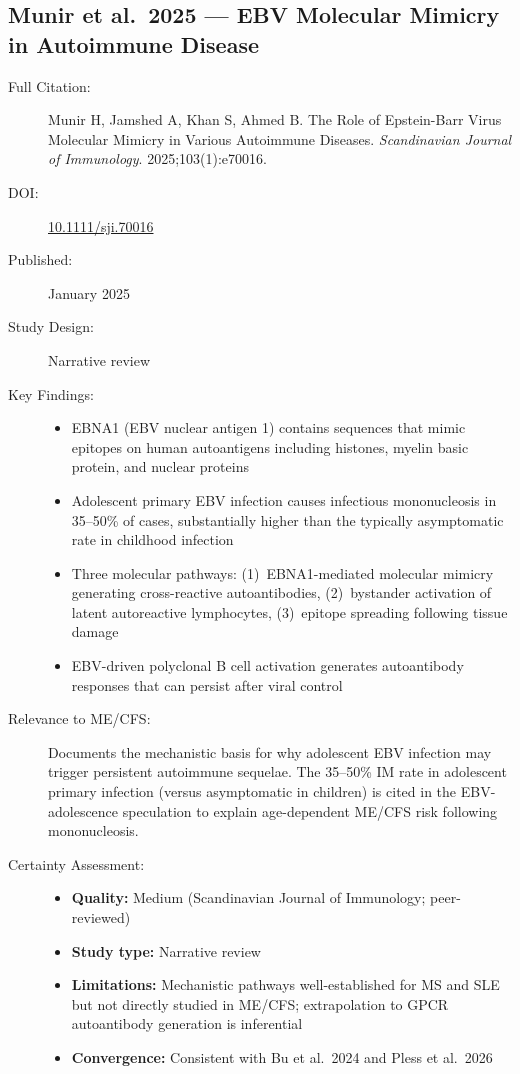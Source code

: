 \subsection{Munir et al.\ 2025 --- EBV Molecular Mimicry in Autoimmune Disease}

\begin{description}
    \item[Full Citation:] Munir H, Jamshed A, Khan S, Ahmed B. The Role of Epstein-Barr Virus Molecular Mimicry in Various Autoimmune Diseases. \textit{Scandinavian Journal of Immunology}. 2025;103(1):e70016.
    \item[DOI:] \href{https://doi.org/10.1111/sji.70016}{10.1111/sji.70016}
    \item[Published:] January 2025
    \item[Study Design:] Narrative review
    \item[Key Findings:]
    \begin{itemize}
        \item EBNA1 (EBV nuclear antigen 1) contains sequences that mimic epitopes on human autoantigens including histones, myelin basic protein, and nuclear proteins
        \item Adolescent primary EBV infection causes infectious mononucleosis in 35--50\% of cases, substantially higher than the typically asymptomatic rate in childhood infection
        \item Three molecular pathways: (1)~EBNA1-mediated molecular mimicry generating cross-reactive autoantibodies, (2)~bystander activation of latent autoreactive lymphocytes, (3)~epitope spreading following tissue damage
        \item EBV-driven polyclonal B cell activation generates autoantibody responses that can persist after viral control
    \end{itemize}
    \item[Relevance to ME/CFS:] Documents the mechanistic basis for why adolescent EBV infection may trigger persistent autoimmune sequelae. The 35--50\% IM rate in adolescent primary infection (versus asymptomatic in children) is cited in the EBV-adolescence speculation to explain age-dependent ME/CFS risk following mononucleosis.
    \item[Certainty Assessment:]
    \begin{itemize}
        \item \textbf{Quality:} Medium (Scandinavian Journal of Immunology; peer-reviewed)
        \item \textbf{Study type:} Narrative review
        \item \textbf{Limitations:} Mechanistic pathways well-established for MS and SLE but not directly studied in ME/CFS; extrapolation to GPCR autoantibody generation is inferential
        \item \textbf{Convergence:} Consistent with Bu et al.\ 2024 and Pless et al.\ 2026
    \end{itemize}
\end{description}

